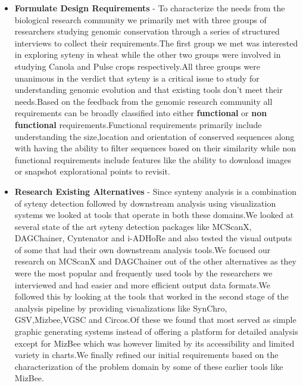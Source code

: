 \begin{itemize}
    
    \item \textbf{Formulate Design Requirements} -
    To characterize the needs from the biological research community we primarily met with three groups of researchers studying genomic conservation through a series of structured interviews to collect their requirements.The first group we met was interested in exploring syteny in wheat while the other two groups were involved in studying Canola and Pulse crops respectively.All three groups were unanimous in the verdict that syteny is a critical issue to study for understanding genomic evolution and that existing tools don't meet their needs.Based on the feedback from the genomic research community all requirements can be broadly classified into either \textbf{functional} or \textbf{non functional} requirements.Functional requirements primarily include understanding the size,location and orientation of conserved sequences along with having the ability to filter sequences based on their similarity while non functional requirements include features like the ability to download images or snapshot explorational points to revisit.
    
    \item \textbf{Research Existing Alternatives} - 
    Since synteny analysis is a combination of syteny detection followed by downstream analysis using visualization systems we looked at tools that operate in both these domains.We looked at several state of the art syteny detection packages like MCScanX, DAGChainer, Cyntenator and i-ADHoRe and also tested the visual outputs of some that had their own downstream analysis tools.We focused our research on MCScanX and DAGChainer out of the other alternatives as they were the most popular and frequently used tools by the researchers we interviewed and had easier and more efficient output data formats.We followed this by looking at the tools that worked  in the second stage of the analysis pipeline by providing visualizations like SynChro, GSV,Mizbee,VGSC and Circos.Of these we found that most served as simple graphic generating systems instead of offering a platform for detailed analysis except for MizBee which was however limited by its accessibility and limited variety in charts.We finally refined our initial requirements based on the characterization of the problem domain by some of these earlier tools like MizBee.


\end{itemize}
